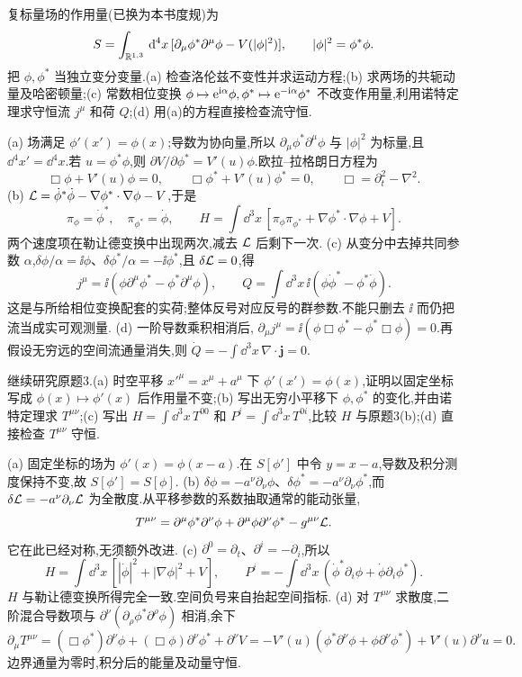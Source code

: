 \begin{exercise}
复标量场的作用量(已换为本书度规)为
\[
S=\int_{\mathbb R^{1,3}}\,\mathrm d^4x\,[\partial_\mu\phi^*\partial^\mu\phi-V(|\phi|^2)],\qquad |\phi|^2=\phi^*\phi.
\]
把 $\phi,\phi^*$ 当独立变分变量.(a) 检查洛伦兹不变性并求运动方程;(b) 求两场的共轭动量及哈密顿量;(c) 常数相位变换 $\phi\mapsto\mathrm e^{\mathrm i\alpha}\phi,\phi^*\mapsto\mathrm e^{-\mathrm i\alpha}\phi^*$ 不改变作用量,利用诺特定理求守恒流 $j^\mu$ 和荷 $Q$;(d) 用(a)的方程直接检查流守恒.
\end{exercise}
\begin{solution}
(a) 场满足 $\phi'(x')=\phi(x)$;导数为协向量,所以 $\partial_\mu\phi^*\partial^\mu\phi$ 与 $|\phi|^2$ 为标量,且 $\dd^4x'=\dd^4x$.若 $u=\phi^*\phi$,则 $\partial V/\partial\phi^*=V'(u)\phi$.欧拉--拉格朗日方程为
\[
\Box\phi+V'(u)\phi=0,\qquad \Box\phi^*+V'(u)\phi^*=0,\qquad
\Box=\partial_t^2-\nabla^2.
\]
(b) $\mathcal L=\dot\phi^*\dot\phi-\nabla\phi^*\cdot\nabla\phi-V$,于是
\[
\pi_\phi=\dot\phi^*,\quad\pi_{\phi^*}=\dot\phi,\qquad
H=\int\dd^3x\,[\pi_\phi\pi_{\phi^*}+\nabla\phi^*\cdot\nabla\phi+V].
\]
两个速度项在勒让德变换中出现两次,减去 $\mathcal L$ 后剩下一次.
(c) 从变分中去掉共同参数 $\alpha$,$\delta\phi/\alpha=\ii\phi$、$\delta\phi^*/\alpha=-\ii\phi^*$,且 $\delta\mathcal L=0$,得
\[
j^\mu=\ii(\phi\partial^\mu\phi^*-\phi^*\partial^\mu\phi),\qquad
Q=\int\dd^3x\,\ii(\phi\dot\phi^*-\phi^*\dot\phi).
\]
这是与所给相位变换配套的实荷;整体反号对应反号的群参数.不能只删去 $\ii$ 而仍把流当成实可观测量.
(d) 一阶导数乘积相消后,
$\partial_\mu j^\mu=\ii(\phi\Box\phi^*-\phi^*\Box\phi)=0$.再假设无穷远的空间流通量消失,则 $\dot Q=-\int\dd^3x\,\nabla\cdot\mathbf j=0$.
\end{solution}

\begin{exercise}
继续研究原题3.(a) 时空平移 $x'^\mu=x^\mu+a^\mu$ 下 $\phi'(x')=\phi(x)$,证明以固定坐标写成 $\phi(x)\mapsto\phi'(x)$ 后作用量不变;(b) 写出无穷小平移下 $\phi,\phi^*$ 的变化,并由诺特定理求 $T^{\mu\nu}$;(c) 写出 $H=\int\dd^3x\,T^{00}$ 和 $P^i=\int\dd^3x\,T^{0i}$,比较 $H$ 与原题3(b);(d) 直接检查 $T^{\mu\nu}$ 守恒.
\end{exercise}
\begin{solution}
(a) 固定坐标的场为 $\phi'(x)=\phi(x-a)$.在 $S[\phi']$ 中令 $y=x-a$,导数及积分测度保持不变,故 $S[\phi']=S[\phi]$.
(b) $\delta\phi=-a^\nu\partial_\nu\phi$、$\delta\phi^*=-a^\nu\partial_\nu\phi^*$,而 $\delta\mathcal L=-a^\nu\partial_\nu\mathcal L$ 为全散度.从平移参数的系数抽取通常的能动张量,
\[
T^{\mu\nu}=\partial^\mu\phi^*\partial^\nu\phi+\partial^\mu\phi\partial^\nu\phi^*-g^{\mu\nu}\mathcal L.
\]
它在此已经对称,无须额外改进.
(c) $\partial^0=\partial_t$、$\partial^i=-\partial_i$,所以
\[
H=\int\dd^3x\,[|\dot\phi|^2+|\nabla\phi|^2+V],\qquad
P^i=-\int\dd^3x\,(\dot\phi^*\partial_i\phi+\dot\phi\partial_i\phi^*).
\]
$H$ 与勒让德变换所得完全一致.空间负号来自抬起空间指标.
(d) 对 $T^{\mu\nu}$ 求散度,二阶混合导数项与 $\partial^\nu(\partial_\rho\phi^*\partial^\rho\phi)$ 相消,余下
\[
\partial_\mu T^{\mu\nu}
=(\Box\phi^*)\partial^\nu\phi+(\Box\phi)\partial^\nu\phi^*+\partial^\nu V
=-V'(u)(\phi^*\partial^\nu\phi+\phi\partial^\nu\phi^*)+V'(u)\partial^\nu u=0.
\]
边界通量为零时,积分后的能量及动量守恒.
\end{solution}
